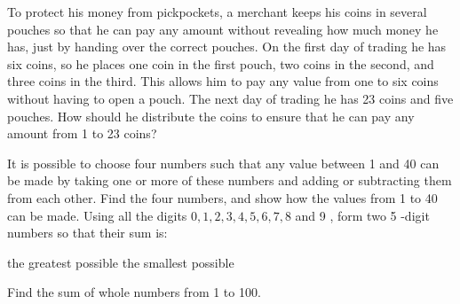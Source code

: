 \begin{exercises}
\begin{questions}
\begin{center}
        \end{center}
        \Question[3] To protect his money from pickpockets, a merchant keeps his coins in several pouches so that he can pay any amount without revealing how much money he has, just by handing over the correct pouches. On the first day of trading he has six coins, so he places one coin in the first pouch, two coins in the second, and three coins in the third. This allows him to pay any value from one to six coins without having to open a pouch. The next day of trading he has 23 coins and five pouches. How should he distribute the coins to ensure that he can pay any amount from 1 to 23 coins?
            \begin{solutionordottedlines}[2in]
            \end{solutionordottedlines}
        \Question[3] It is possible to choose four numbers such that any value between 1 and 40 can be made by taking one or more of these numbers and adding or subtracting them from each other. Find the four numbers, and show how the values from 1 to 40 can be made.
        \question Using all the digits \(0,1,2,3,4,5,6,7,8\) and 9 , form two 5 -digit numbers so that their sum is:
        \begin{parts}
            \Part[1] the greatest possible
            \Part[1] the smallest possible
        \end{parts}
        \Question[3] Find the sum of whole numbers from 1 to 100.
        \begin{solutionorbox}[2in]
        \end{solutionorbox}
    \end{questions}
\end{exercises}

